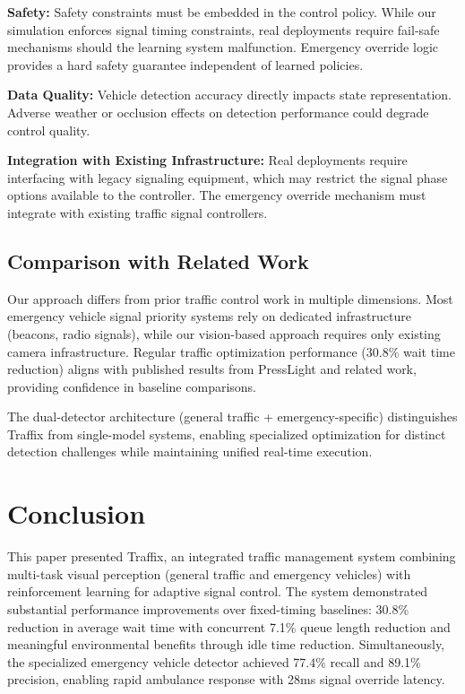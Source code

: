 \documentclass[10pt,conference]{IEEEtran}
\begin{document}
\textbf{Safety:} Safety constraints must be embedded in the control policy. While our simulation enforces signal timing constraints, real deployments require fail-safe mechanisms should the learning system malfunction. Emergency override logic provides a hard safety guarantee independent of learned policies.

\textbf{Data Quality:} Vehicle detection accuracy directly impacts state representation. Adverse weather or occlusion effects on detection performance could degrade control quality.

\textbf{Integration with Existing Infrastructure:} Real deployments require interfacing with legacy signaling equipment, which may restrict the signal phase options available to the controller. The emergency override mechanism must integrate with existing traffic signal controllers.

\subsection{Comparison with Related Work}

Our approach differs from prior traffic control work in multiple dimensions. Most emergency vehicle signal priority systems rely on dedicated infrastructure (beacons, radio signals), while our vision-based approach requires only existing camera infrastructure. Regular traffic optimization performance (30.8\% wait time reduction) aligns with published results from PressLight and related work, providing confidence in baseline comparisons.

The dual-detector architecture (general traffic + emergency-specific) distinguishes Traffix from single-model systems, enabling specialized optimization for distinct detection challenges while maintaining unified real-time execution.

\section{Conclusion}

This paper presented Traffix, an integrated traffic management system combining multi-task visual perception (general traffic and emergency vehicles) with reinforcement learning for adaptive signal control. The system demonstrated substantial performance improvements over fixed-timing baselines: 30.8\% reduction in average wait time with concurrent 7.1\% queue length reduction and meaningful environmental benefits through idle time reduction. Simultaneously, the specialized emergency vehicle detector achieved 77.4\% recall and 89.1\% precision, enabling rapid ambulance response with 28ms signal override latency.
\end{document}
